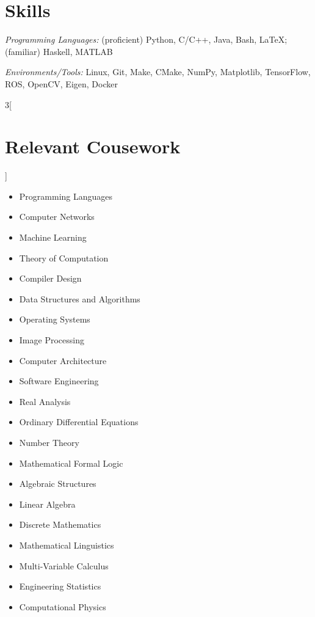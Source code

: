 \documentclass[\ifdefined\cv11pt\else10pt\fi,letterpaper,roman]{moderncv}
\newcommand{\cvonly}[1]{\ifdefined\cv#1\fi}
\let\oldsection\section
\renewcommand{\section}[1]{\vspace*{-1.3ex}\oldsection{#1}\vspace*{-0.5ex}}
\begin{document}
\section{Skills}
\textit{Programming Languages:} (proficient) Python, C/C++, Java, Bash, \LaTeX; (familiar) Haskell, MATLAB \par
\textit{Environments/Tools:} Linux, Git, Make, CMake, NumPy, Matplotlib, TensorFlow, ROS, OpenCV\cvonly{, Eigen, Docker} \par
\begin{multicols}{3}[\section{Relevant Cousework}\vspace*{-1.2\topsep}]
\begin{itemize}
	\item Programming Languages
	\item Computer Networks
	\item Machine Learning
	\item Theory of Computation
	\item Compiler Design
	\item Data Structures and Algorithms
	\item Operating Systems
	\item Image Processing
	\item Computer Architecture
	\item Software Engineering
	\item Real Analysis
	\item Ordinary Differential Equations
	\item Number Theory
	\item Mathematical Formal Logic
	\item Algebraic Structures
	\item Linear Algebra
	\item Discrete Mathematics
	\cvonly{
		\item Mathematical Linguistics
		\item Multi-Variable Calculus
		\item Engineering Statistics
		\item Computational Physics
	}
\end{itemize}
\end{multicols}
\vspace{-2.8ex}
\end{document}

